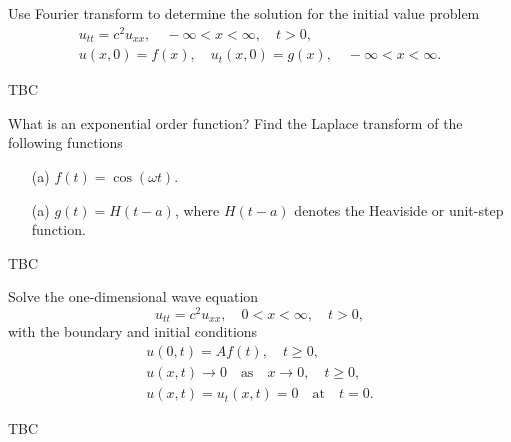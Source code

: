 \documentclass[11pt]{penrose}
\begin{document}
\begin{problem}{3}
    Use Fourier transform to determine the solution for the initial value problem
    \begin{gather*}
        u_{tt} = c^2 u_{xx}, \quad -\infty < x < \infty, \quad t > 0,\\
        u(x,0) = f(x), \quad u_{t}(x,0) = g(x), \quad -\infty < x < \infty.
    \end{gather*}
    
    \solution TBC
\end{problem}

\begin{problem}{4}
    What is an exponential order function? Find the Laplace transform of the following functions
    \begin{enumerate}
        \item[(a)] $f(t) = \cos(\omega t)$.
        \item[(a)] $g(t) = H(t-a)$, where $H(t-a)$ denotes the Heaviside or unit-step function.
    \end{enumerate}
    
    \solution TBC
\end{problem}

\begin{problem}{5}
    Solve the one-dimensional wave equation
    \begin{equation*}
        u_{tt} = c^2 u_{xx}, \quad 0 < x < \infty, \quad t > 0,
    \end{equation*}
    with the boundary and initial conditions
    \begin{gather*}
        u(0,t) = A f(t), \quad t \geq 0,\\
        u(x,t) \to 0 \quad\text{as}\quad x \to 0, \quad t \geq 0,\\
        u(x,t) = u_t(x,t) = 0 \quad\text{at}\quad t = 0.
    \end{gather*}
    
    \solution TBC
\end{problem}
\end{document}
